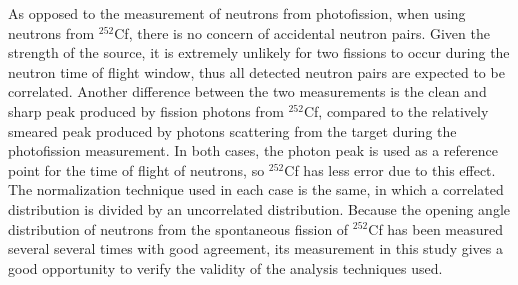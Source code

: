 As opposed to the measurement of neutrons from photofission, when using neutrons from $^{252}$Cf, there is no concern of accidental neutron pairs. Given the strength of the source, it is extremely unlikely for two fissions to occur during the neutron time of flight window, thus all detected neutron pairs are expected to be correlated. Another difference between the two measurements is the clean and sharp peak produced by fission photons from $^{252}$Cf, compared to the relatively smeared peak produced by photons scattering from the target during the photofission measurement. In both cases, the photon peak is used as a reference point for the time of flight of neutrons, so $^{252}$Cf has less error due to this effect. The normalization technique used in each case is the same, in which a correlated distribution is divided by an uncorrelated distribution. Because the opening angle distribution of neutrons from the spontaneous fission of $^{252}$Cf has been measured several several times with good agreement, its measurement in this study gives a good opportunity to verify the validity of the analysis techniques used.  
